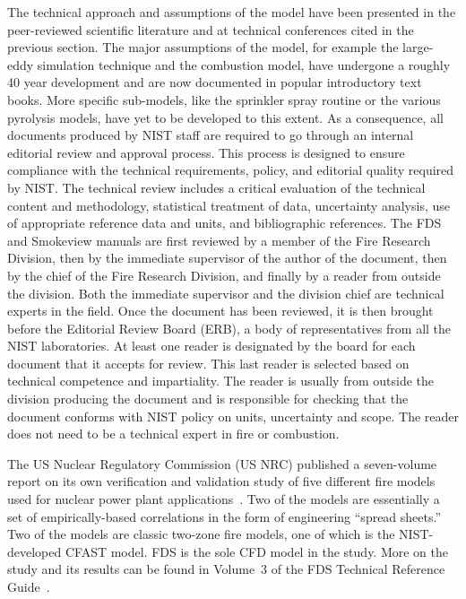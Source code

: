 \documentclass[11pt]{book}
\begin{document}
The technical approach and assumptions of the model have been presented in the peer-reviewed scientific literature and at technical conferences cited in the previous section. The major assumptions of the model, for example the large-eddy simulation technique and the combustion model, have undergone a roughly 40 year development and are now documented in popular introductory text books. More specific sub-models, like the sprinkler spray routine or the various pyrolysis models, have yet to be developed to this extent. As a consequence, all documents produced by NIST staff are required to go through an internal editorial review and approval process. This process is designed to ensure compliance with the technical requirements, policy, and editorial quality required by NIST. The technical review includes a critical evaluation of the technical content and methodology, statistical treatment of data, uncertainty analysis, use of appropriate reference data and units, and bibliographic references. The FDS and Smokeview manuals are first reviewed by a member of the Fire Research Division, then by the immediate supervisor of the author of the document, then by the chief of the Fire Research Division, and finally by a reader from outside the division. Both the immediate supervisor and the division
chief are technical experts in the field. Once the document has been reviewed, it is then brought before the Editorial Review Board (ERB), a body of representatives from all the NIST laboratories. At least one reader is designated by the board for each document that it accepts for review. This last reader is selected based on technical competence and impartiality. The reader is usually from outside the division producing the document and is responsible for checking that the document conforms with NIST policy on units, uncertainty and scope. The reader does not need to be a technical expert in fire or combustion.

The US Nuclear Regulatory Commission (US NRC) published a seven-volume report on its own verification and validation study of five different fire models used for nuclear power plant applications~\cite{NUREG_1824_Sup_1}. Two of the models are essentially a set of empirically-based correlations in the form of engineering ``spread sheets.'' Two of the models are classic two-zone fire models, one of which is the NIST-developed CFAST model. FDS is the sole CFD model in the study. More on the study and its results can be found in Volume~3 of the FDS Technical Reference Guide~\cite{FDS_Tech_Guide}.
\end{document}
